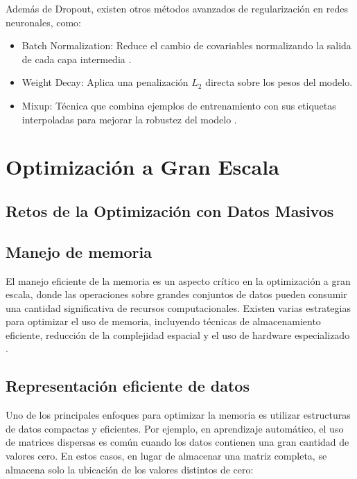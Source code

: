 \begin{itemize}
		Además de Dropout, existen otros métodos avanzados de regularización en redes neuronales, como:
		\begin{itemize}
			\item Batch Normalization: Reduce el cambio de covariables normalizando la salida de cada capa intermedia \cite{ioffe2015batch}.
			\item Weight Decay: Aplica una penalización \(L_2\) directa sobre los pesos del modelo.
			\item Mixup: Técnica que combina ejemplos de entrenamiento con sus etiquetas interpoladas para mejorar la robustez del modelo \cite{zhang2017mixup}.
		\end{itemize}
		\section{Optimización a Gran Escala}
		
		\subsection{Retos de la Optimización con Datos Masivos}
		
		\subsection {Manejo de memoria}
		
		El manejo eficiente de la memoria es un aspecto crítico en la optimización a gran escala, donde las operaciones sobre grandes conjuntos de datos pueden consumir una cantidad significativa de recursos computacionales. Existen varias estrategias para optimizar el uso de memoria, incluyendo técnicas de almacenamiento eficiente, reducción de la complejidad espacial y el uso de hardware especializado \cite{gonzalez2014large}.
		
		\subsection{Representación eficiente de datos}
		
		Uno de los principales enfoques para optimizar la memoria es utilizar estructuras de datos compactas y eficientes. Por ejemplo, en aprendizaje automático, el uso de matrices dispersas es común cuando los datos contienen una gran cantidad de valores cero. En estos casos, en lugar de almacenar una matriz completa, se almacena solo la ubicación de los valores distintos de cero:
		

\end{itemize}
